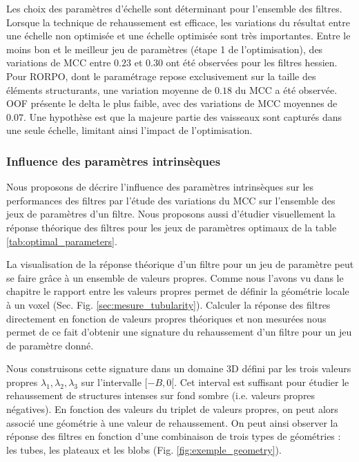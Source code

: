 Les choix des paramètres d'échelle sont déterminant pour l'ensemble des filtres. Lorsque la technique de rehaussement est efficace, les variations du résultat entre une échelle non optimisée et une échelle optimisée sont très importantes. Entre le moins bon et le meilleur jeu de paramètres (étape 1 de l'optimisation), des variations de MCC entre $0.23$ et $0.30$ ont été observées pour les filtres hessien. Pour RORPO, dont le paramétrage repose exclusivement sur la taille des éléments structurants, une variation moyenne de $0.18$ du MCC a été observée. OOF présente le delta le plus faible, avec des variations de MCC moyennes de $0.07$. Une hypothèse est que la majeure partie des vaisseaux sont capturés dans une seule échelle, limitant ainsi l'impact de l'optimisation.

\subsubsection{Influence des paramètres intrinsèques}

Nous proposons de décrire l'influence des paramètres intrinsèques sur les performances des filtres par l'étude des variations du MCC sur l'ensemble des jeux de paramètres d'un filtre. Nous proposons aussi d'étudier visuellement la réponse théorique des filtres pour les jeux de paramètres optimaux de la table \ref{tab:optimal_parameters}.

La visualisation de la réponse théorique d'un filtre pour un jeu de paramètre peut se faire grâce à un ensemble de valeurs propres. Comme nous l'avons vu dans le chapitre \chapSOTAN{} le rapport entre les valeurs propres permet de définir la géométrie locale à un voxel (Sec. \chapSOTAN{} Fig. \ref{sec:mesure_tubularity}). Calculer la réponse des filtres directement en fonction de valeurs propres théoriques et non mesurées nous permet de ce fait d'obtenir une signature du rehaussement d'un filtre pour un jeu de paramètre donné.  

Nous construisons cette signature dans un domaine 3D défini par les trois valeurs propres $\lambda_1,\lambda_2,\lambda_3$ sur l'intervalle $[-B,0[$. Cet interval est suffisant pour étudier le rehaussement de structures intenses sur fond sombre (i.e. valeurs propres négatives). En fonction des valeurs du triplet de valeurs propres, on peut alors associé une géométrie à une valeur de rehaussement. On peut ainsi observer la réponse des filtres en fonction d'une combinaison de trois types de géométries : les tubes, les plateaux et les blobs (Fig. \ref{fig:exemple_geometry}).

